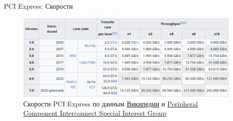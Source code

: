 \documentclass[xetex,aspectratio=43]{beamer}
\begin{document}
\begin{frame}{PCI Express: Скорости}
    \begin{figure}
        \includegraphics[height=0.5\textheight]{img/04.PCI-E_Speeds.png}
        \caption{Скорости PCI Express по данным \href{https://en.wikipedia.org/wiki/PCI\_Express\#History\_and\_revisions}{Википедии} и \href{https://web.archive.org/web/20131019114456/http://www.pcisig.com/news_room/faqs/pcie3.0\_faq/PCI-SIG\_PCIe\_3\_0\_FAQ\_Final\_07102012.pdf}{Peripheral Component Interconnect Special Interest Group}}
    \end{figure}
\end{frame}
\end{document}
